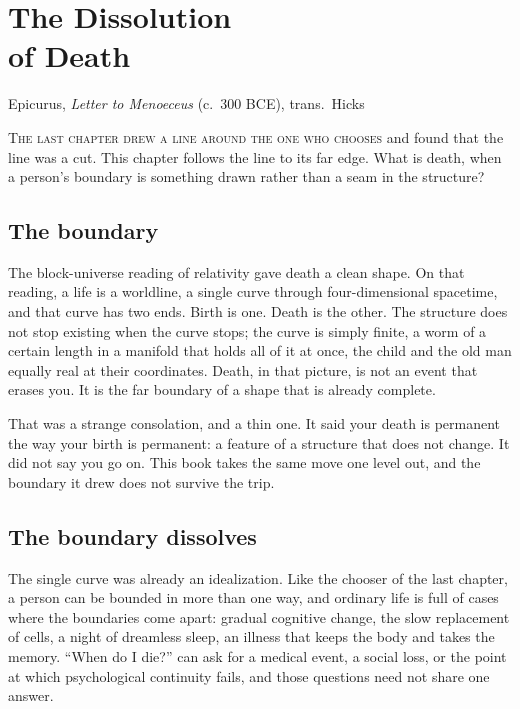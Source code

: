 \chapter[The Dissolution of Death]{The Dissolution\\of Death}

{Epicurus, \textit{Letter to Menoeceus} (c.\ 300 BCE), trans.\ Hicks}

\noindent \textsc{The last chapter drew a line around the one who chooses} and found that the line was a cut. This chapter follows the line to its far edge. What is death, when a person's boundary is something drawn rather than a seam in the structure?

\section*{The boundary}

The block-universe reading of relativity gave death a clean shape. On that reading, a life is a worldline, a single curve through four-dimensional spacetime, and that curve has two ends. Birth is one. Death is the other. The structure does not stop existing when the curve stops; the curve is simply finite, a worm of a certain length in a manifold that holds all of it at once, the child and the old man equally real at their coordinates. Death, in that picture, is not an event that erases you. It is the far boundary of a shape that is already complete.

That was a strange consolation, and a thin one. It said your death is permanent the way your birth is permanent: a feature of a structure that does not change. It did not say you go on. This book takes the same move one level out, and the boundary it drew does not survive the trip.

\section*{The boundary dissolves}

The single curve was already an idealization. Like the chooser of the last chapter, a person can be bounded in more than one way, and ordinary life is full of cases where the boundaries come apart: gradual cognitive change, the slow replacement of cells, a night of dreamless sleep, an illness that keeps the body and takes the memory. ``When do I die?'' can ask for a medical event, a social loss, or the point at which psychological continuity fails, and those questions need not share one answer.

